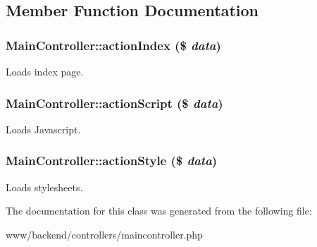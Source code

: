 \subsection{Member Function Documentation}
\hypertarget{classMainController_aa26ba0a9bb1cbc705b092d4a5ba386dd}{
\subsubsection[{actionIndex}]{\setlength{\rightskip}{0pt plus 5cm}MainController::actionIndex (\$ {\em data})}}
\label{classMainController_aa26ba0a9bb1cbc705b092d4a5ba386dd}
Loads index page. \hypertarget{classMainController_aa1324feb6fda13c88bb642d30f57d23b}{
\subsubsection[{actionScript}]{\setlength{\rightskip}{0pt plus 5cm}MainController::actionScript (\$ {\em data})}}
\label{classMainController_aa1324feb6fda13c88bb642d30f57d23b}
Loads Javascript. \hypertarget{classMainController_ade96657aa5ad9ae6b7e170aa9d4e2977}{
\subsubsection[{actionStyle}]{\setlength{\rightskip}{0pt plus 5cm}MainController::actionStyle (\$ {\em data})}}
\label{classMainController_ade96657aa5ad9ae6b7e170aa9d4e2977}
Loads stylesheets. 

The documentation for this class was generated from the following file:\begin{DoxyCompactItemize}
\item 
www/backend/controllers/maincontroller.php\end{DoxyCompactItemize}
